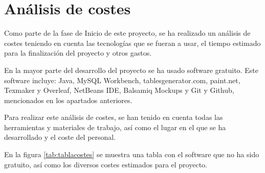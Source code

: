 \section{Análisis de costes}
\label{sec:analisiscostes}
Como parte de la fase de Inicio de este proyecto, se ha realizado un análisis de costes teniendo en cuenta las tecnologías que se fueran a usar, el tiempo estimado para la finalización del proyecto y otros gastos.

En la mayor parte del desarrollo del proyecto se ha usado software gratuito. Este software incluye: Java, MySQL Workbench, tablesgenerator.com, paint.net, Texmaker y Overleaf, NetBeans IDE, Balsamiq Mockups y Git y Github, mencionados en los apartados anteriores.

Para realizar este análisis de costes, se han tenido en cuenta todas las herramientas y materiales de trabajo, así como el lugar en el que se ha desarrollado y el coste del personal.

En la figura \ref{tab:tablacostes} se muestra una tabla con el software que no ha sido gratuito, así como los diversos costes estimados para el proyecto.

